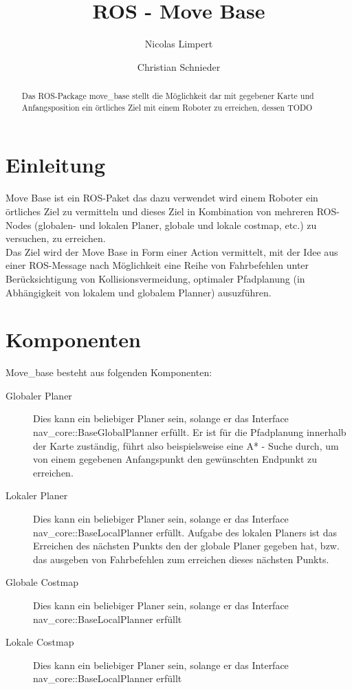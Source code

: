 \documentclass{llncs}
\begin{document}
 \title{ROS - Move Base}

\author{Nicolas Limpert \and Christian Schnieder} 

\maketitle
\tableofcontents


\begin{abstract} Das ROS-Package move\_base stellt  die Möglichkeit dar mit gegebener Karte und Anfangsposition ein örtliches Ziel mit einem Roboter zu erreichen, dessen TODO \end{abstract}

\section{Einleitung}
Move Base ist ein ROS-Paket das dazu verwendet wird einem Roboter ein örtliches Ziel zu vermitteln und dieses Ziel in Kombination von mehreren ROS-Nodes (globalen- und lokalen Planer, globale und lokale costmap, etc.) zu versuchen, zu erreichen.\\
Das Ziel wird der Move Base in Form einer Action vermittelt, mit der Idee aus einer ROS-Message nach Möglichkeit eine Reihe von Fahrbefehlen unter Berücksichtigung von Kollisionsvermeidung, optimaler Pfadplanung (in Abhängigkeit von lokalem und globalem Planner) ausuzführen.

\section{Komponenten}
Move\_base besteht aus folgenden Komponenten:
\begin{description}
\item[Globaler Planer]
Dies kann ein beliebiger Planer sein, solange er das Interface nav\_core::BaseGlobalPlanner erfüllt. Er ist für die Pfadplanung innerhalb der Karte zuständig, führt also beispielsweise eine A* - Suche durch, um von einem gegebenen Anfangspunkt den gewünschten Endpunkt zu erreichen.
\item[Lokaler Planer]
Dies kann ein beliebiger Planer sein, solange er das Interface nav\_core::BaseLocalPlanner erfüllt. Aufgabe des lokalen Planers ist das Erreichen des nächsten Punkts den der globale Planer gegeben hat, bzw. das ausgeben von Fahrbefehlen zum erreichen dieses nächsten Punkts.
\item[Globale Costmap]
Dies kann ein beliebiger Planer sein, solange er das Interface nav\_core::BaseLocalPlanner erfüllt
\item[Lokale Costmap]
Dies kann ein beliebiger Planer sein, solange er das Interface nav\_core::BaseLocalPlanner erfüllt
\end{description}
\end{document}
